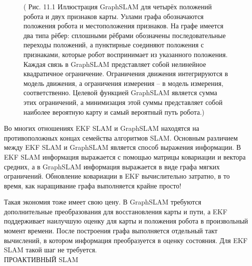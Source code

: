 \documentclass[10pt,a4paper]{article}
\begin{document}
\begin{figure}[H]
	\caption{ ( Рис. 11.1  Иллюстрация GraphSLAM для четырёх положений робота и двух признаков карты.  Узлами графа обозначаются положения робота и местоположения признаков. На графе имеется два типа рёбер: сплошными рёбрами обозначены последовательные переходы положений, а пунктирные соединяют положения с признаками, которые робот воспринимает из указанного положения. Каждая связь в GraphSLAM представляет собой нелинейное квадратичное ограничение. Ограничения движения интегрируются в модель движения, а ограничения измерения – в модель измерения, соответственно. Целевой функцией GraphSLAM является сумма этих ограничений, а минимизация этой суммы представляет собой наиболее вероятную карту и самый вероятный путь робота.)}
	\label{fig:111orig}
\end{figure}

Во многих отношениях EKF SLAM и GraphSLAM находятся на противоположных концах семейства алгоритмов SLAM. Основным различием между EKF SLAM и GraphSLAM является способ выражения информации. В  EKF SLAM информация выражается с помощью матрицы ковариации и вектора средних, а в GraphSLAM информация выражается в виде графа мягких ограничений. Обновление ковариации в EKF вычислительно затратно, в то время, как наращивание графа выполняется крайне просто!

Такая экономия тоже имеет свою цену. В GraphSLAM требуются дополнительные преобразования для восстановления карты и пути, а EKF поддерживает наилучшую оценку для карты и положения робота в произвольный момент времени. После построения графа выполняется отдельный такт вычислений, в котором информация преобразуется в оценку состояния.  Для EKF SLAM такой шаг не требуется.\\

ПРОАКТИВНЫЙ SLAM\\
\end{document}
